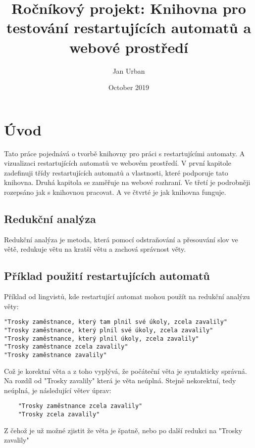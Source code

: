 \documentclass{article}
\title{ Ročníkový projekt: Knihovna pro testování restartujících automatů a webové prostředí}
\author{Jan Urban}
\date{October 2019}
\begin{document}
\maketitle

\newpage

\tableofcontents

\newpage

\section*{Úvod}

Tato práce pojednává o tvorbě knihovny pro práci s restartujícími automaty.
A vizualizaci restartujících automatů ve webovém prostředí.
V první kapitole zadefinuji třídy restartujících automatů a vlastnosti, které podporuje tato knihovna.
Druhá kapitola se zaměřuje na webové rozhraní.
Ve třetí je podrobněji rozepsáno jak s knihovnou pracovat.
A ve čtvrté je jak knihovna funguje.

\subsection{Redukční analýza}
Redukční analýza je metoda, která pomocí odstraňování a přesouvání slov ve větě,
redukuje větu na kratší větu a zachová správnost věty.


\subsection{Příklad použití restartujících automatů}
Příklad od lingvistů, kde restartující automat mohou použít na redukční analýzu věty:

\begin{verbatim}
"Trosky zaměstnance, který tam plnil své úkoly, zcela zavalily"
"Trosky zaměstnance, který plnil své úkoly, zcela zavalily"
"Trosky zaměstnance, který plnil úkoly, zcela zavalily"
"Trosky zaměstnance zcela zavalily"
"Trosky zaměstnance zavalily"
\end{verbatim}

Což je korektní věta a z toho vyplývá, že počáteční věta je syntakticky správná.
Na rozdíl od "Trosky zavalily" která je věta neúplná.
Stejně nekorektní, tedy neúplná, je následující větev úprav:

\begin{verbatim}
	"Trosky zaměstnance zcela zavalily"
	"Trosky zcela zavalily"
\end{verbatim}

Z čehož je už možné zjistit že věta je špatně, nebo po další redukci na "Trosky zavalily"
\end{document}
